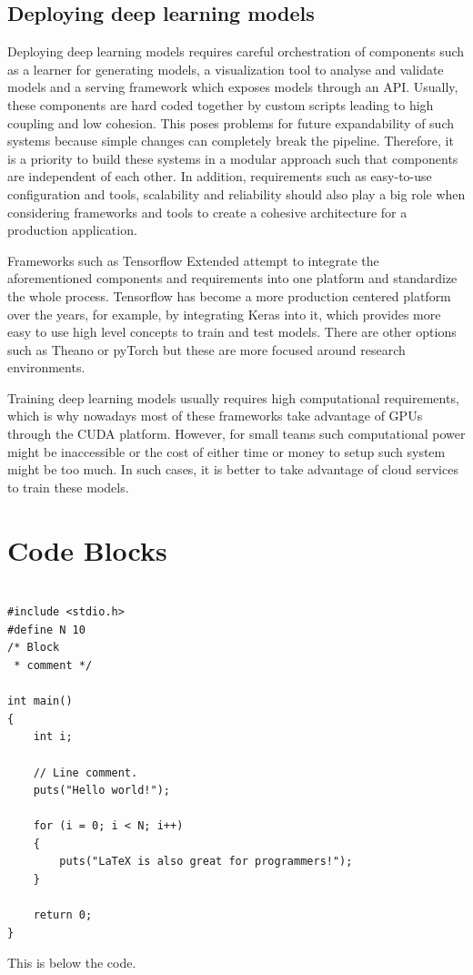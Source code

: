 \subsection{Deploying deep learning models}
Deploying deep learning models requires careful orchestration of components such as a learner for generating models, a visualization tool to analyse and validate models and a serving framework which exposes models through an API. Usually, these components are hard coded together by custom scripts leading to high coupling and low cohesion. This poses problems for future expandability of such systems because simple changes can completely break the pipeline. Therefore, it is a priority to build these systems in a modular approach such that components are independent of each other. In addition, requirements such as easy-to-use configuration and tools, scalability and reliability should also play a big role when considering frameworks and tools to create a cohesive architecture for a production application. \par
Frameworks such as Tensorflow Extended\cite{Baylor2017} attempt to integrate the aforementioned components and requirements into one platform and standardize the whole process. Tensorflow has become a more production centered platform over the years, for example, by integrating Keras\cite{chollet2015keras} into it, which provides more easy to use high level concepts to train and test models. There are other options such as Theano\cite{Bastien} or pyTorch\cite{pytorch} but these are more focused around research environments. \par   
Training deep learning models usually requires high computational requirements, which is why nowadays most of these frameworks take advantage of GPUs through the CUDA platform. However, for small teams such computational power might be inaccessible or the cost of either time or money to setup such system might be too much. In such cases, it is better to take advantage of cloud services to train these models.  

\section{Code Blocks}
\lipsum[5]

\begin{listing}
\begin{verbatim}

#include <stdio.h>
#define N 10
/* Block
 * comment */
 
int main()
{
    int i;
 
    // Line comment.
    puts("Hello world!");
 
    for (i = 0; i < N; i++)
    {
        puts("LaTeX is also great for programmers!");
    }
 
    return 0;
}
\end{verbatim}
\caption{This is below the code.}
\label{lbl:snippet-test}
\end{listing}

\lipsum[5]
